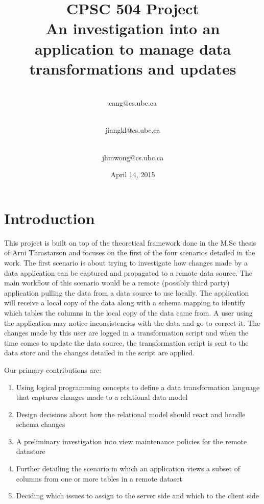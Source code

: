 \documentclass[12pt]{article}
\begin{document}
\begin{titlepage}
\title{\textbf{CPSC 504 Project\\\vspace{3 cm}\Huge{An investigation into an application to manage data transformations and updates}\vspace{2 cm}}}
\date{\vspace{2 cm} April 14, 2015}

\author{
 \\cang@cs.ubc.ca\\
  \and {}\\jiangkl@cs.ubc.ca\\
  \and {}\\jhmwong@cs.ubc.ca\\ 
}
\maketitle
\thispagestyle{empty}
\end{titlepage}

\newpage
\section{Introduction}
This project is built on top of the theoretical framework done in the M.Sc thesis of Arni Thrastarson \cite{arniThesis} and focuses on the first of the four scenarios detailed in the work. The first scenario is about trying to investigate how changes made by a data application can be captured and propagated to a remote data source. The main workflow of this scenario would be a remote (possibly third party) application pulling the data from a data source to use locally. The application will receive a local copy of the data along with a schema mapping to identify which tables the columns in the local copy of the data came from. A user using the application may notice inconsistencies with the data and go to correct it. The changes made by this user are logged in a transformation script and when the time comes to update the data source, the transformation script is sent to the data store and the changes detailed in the script are applied.

\noindent Our primary contributions are:
\begin{enumerate}
	\item{Using logical programming concepts to define a data transformation language that captures changes made to a relational data model}
	\item{Design decisions about how the relational model should react and handle schema changes}
	\item{A preliminary investigation into view maintenance policies for the remote datastore}
	\item{Further detailing the scenario in which an application views a subset of columns from one or more tables in a remote dataset}
	\item{Deciding which issues to assign to the server side and which to the client side}
\end{enumerate}
\end{document}
